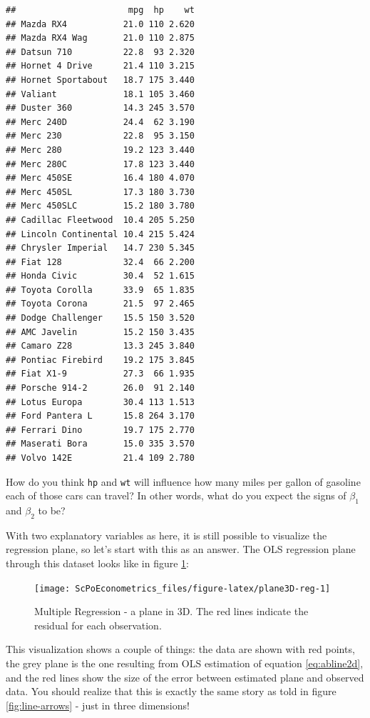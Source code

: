 \documentclass[]{book}
\theoremstyle{definition}
\theoremstyle{definition}
\theoremstyle{definition}
\theoremstyle{remark}
\begin{document}
\begin{verbatim}
##                      mpg  hp    wt
## Mazda RX4           21.0 110 2.620
## Mazda RX4 Wag       21.0 110 2.875
## Datsun 710          22.8  93 2.320
## Hornet 4 Drive      21.4 110 3.215
## Hornet Sportabout   18.7 175 3.440
## Valiant             18.1 105 3.460
## Duster 360          14.3 245 3.570
## Merc 240D           24.4  62 3.190
## Merc 230            22.8  95 3.150
## Merc 280            19.2 123 3.440
## Merc 280C           17.8 123 3.440
## Merc 450SE          16.4 180 4.070
## Merc 450SL          17.3 180 3.730
## Merc 450SLC         15.2 180 3.780
## Cadillac Fleetwood  10.4 205 5.250
## Lincoln Continental 10.4 215 5.424
## Chrysler Imperial   14.7 230 5.345
## Fiat 128            32.4  66 2.200
## Honda Civic         30.4  52 1.615
## Toyota Corolla      33.9  65 1.835
## Toyota Corona       21.5  97 2.465
## Dodge Challenger    15.5 150 3.520
## AMC Javelin         15.2 150 3.435
## Camaro Z28          13.3 245 3.840
## Pontiac Firebird    19.2 175 3.845
## Fiat X1-9           27.3  66 1.935
## Porsche 914-2       26.0  91 2.140
## Lotus Europa        30.4 113 1.513
## Ford Pantera L      15.8 264 3.170
## Ferrari Dino        19.7 175 2.770
## Maserati Bora       15.0 335 3.570
## Volvo 142E          21.4 109 2.780
\end{verbatim}

How do you think \texttt{hp} and \texttt{wt} will influence how many
miles per gallon of gasoline each of those cars can travel? In other
words, what do you expect the signs of \(\beta_1\) and \(\beta_2\) to
be?

With two explanatory variables as here, it is still possible to
visualize the regression plane, so let's start with this as an answer.
The OLS regression plane through this dataset looks like in figure
\ref{fig:plane3D-reg}:

\begin{figure}

{\centering \texttt{[image: ScPoEconometrics\_files/figure-latex/plane3D-reg-1]} 

}

\caption{Multiple Regression - a plane in 3D. The red lines indicate the residual for each observation.}\label{fig:plane3D-reg}
\end{figure}

This visualization shows a couple of things: the data are shown with red
points, the grey plane is the one resulting from OLS estimation of
equation \eqref{eq:abline2d}, and the red lines show the size of the error
between estimated plane and observed data. You should realize that this
is exactly the same story as told in figure \ref{fig:line-arrows} - just
in three dimensions!
\end{document}
